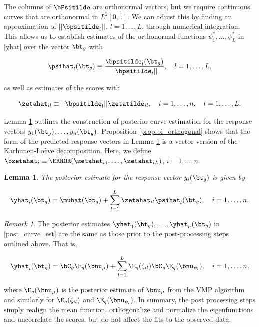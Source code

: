 \documentclass[12pt]{article}
\def\numu{\bnu_\mu}
\newcommand\nupsi[1]{\bnu_{\psi_{#1}}}
\theoremstyle{plain}
\newtheorem{lemma}[theorem]{Lemma}
\theoremstyle{definition}
\theoremstyle{remark}
\newtheorem*{remark}{Remark}
\begin{document}
\noindent The columns of $\bPsitilde$ are orthonormal vectors, but we require continuous curves that are orthonormal in
$L^2 [0, 1]$. We can adjust this by finding an approximation of $|| \bpsitilde_l ||$, $l = 1, \dots, L$, through numerical
integration. This allows us to establish estimates of the orthonormal functions $\psi^*_1, \dots, \psi^*_L$ in
\eqref{yhat} over the vector $\bt_g$ with

\begin{equation}
	\psihat_l (\bt_g) \equiv \frac{\bpsitilde_l (\bt_g)}{|| \bpsitilde_l ||}, \quad l = 1, \dots, L,
\label{psi_star}
\end{equation}

\noindent as well as estimates of the scores with

\[
	\zetahat_{il} \equiv || \bpsitilde_l || \zetatilde_{il}, \quad i = 1, \dots, n, \quad l = 1, \dots, L.
\]

\noindent Lemma \ref{lem:response_est} outlines the construction of posterior curve estimation for the
response vectors $y_1 (\bt_g),
\dots, y_n (\bt_g)$. Proposition \ref{prop:bi_orthogonal} shows that the form of the predicted response vectors
in Lemma \ref{lem:response_est} is a vector version of the Karhunen-Lo\`{e}ve decomposition. Here, we define
$\bzetahat_i \equiv \T{(\zetahat_{i1}, \dots, \zetahat_{iL})}$, $i = 1, \dots, n$.

\begin{lemma}
	
	The posterior estimate for the response vector $y_i (\bt_g)$ is given by
	
	\begin{equation}
		\yhat_i (\bt_g) = \muhat (\bt_g) + \sum_{l=1}^L \zetahat_{il} \psihat_l (\bt_g), \quad i = 1, \dots, n.
	\label{post_curve_est}
	\end{equation}
	
\label{lem:response_est}
\end{lemma}

\begin{remark}
	
	The posterior estimates $\yhat_1 (\bt_g), \dots, \yhat_n (\bt_g)$ in \eqref{post_curve_est} are
	the same as those prior to the post-processing steps outlined above. That is,
	
	\[
		\yhat_i (\bt_g) = \bC_g \E_q (\numu) + \sum_{l=1}^L \E_q (\zeta_{il}) \bC_g \E_q (\nupsi{l}), \quad i = 1, \dots, n,
	\]
	
	\noindent where $\E_q (\numu)$ is the posterior estimate of $\numu$ from the VMP algorithm and similarly for
	$\E_q (\zeta_{il})$ and $\E_q (\nupsi{l})$. In summary, the post processing steps simply realign the mean function,
	orthogonalize and normalize the eigenfunctions and uncorrelate the scores, but do not affect the fits to the
	observed data.
	
\end{remark}
\end{document}
